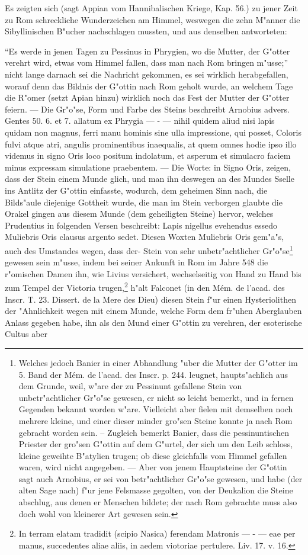 \documentclass[a4paper, 11pt, oneside, polutonikogreek, german]{article}
\begin{document}
Es zeigten sich (sagt Appian vom Hannibalischen Kriege, Kap. 56.) zu jener Zeit zu Rom schreckliche Wunderzeichen am Himmel, weswegen die zehn M"anner die Sibyllinischen B"ucher nachschlagen mussten, und aus denselben antworteten:

"`Es werde in jenen Tagen zu Pessinus in Phrygien, wo die Mutter, der G"otter verehrt wird, etwas vom Himmel fallen, dass man nach Rom bringen m"usse;"' nicht lange darnach sei die Nachricht gekommen, es sei wirklich herabgefallen, worauf denn das Bildnis der G"ottin nach Rom geholt wurde, an welchem Tage die R"omer (setzt Apian hinzu) wirklich noch das Fest der Mutter der G"otter feiern. --- Die Gr"o"se, Form und Farbe des Steins beschreibt Arnobius advers. Gentes 50. 6. et 7. allatum ex Phrygia --- - --- nihil quidem aliud nisi lapis quidam non magnus, ferri manu hominis sine ulla impressione, qui posset, Coloris fulvi atque atri, angulis prominentibus inaequalis, at quem omnes hodie ipso illo videmus in signo Oris loco positum indolatum, et asperum et simulacro faciem minus expressam simulatione praebentem. --- Die Worte: in Signo Oris, zeigen, dass der Stein einem Munde glich, und man ihn deswegen an des Mundes Sselle ins Antlitz der G"ottin einfasste, wodurch, dem geheimen Sinn nach, die Bilds"aule diejenige Gottheit wurde, die man im Stein verborgen glaubte die Orakel gingen aus diesem Munde (dem geheiligten Steine) hervor, welches Prudentius in folgenden Versen beschreibt: Lapis nigellus evehendus essedo Muliebris Oris clausus argento sedet. Diesen Woxten Muliebris Oris gem"a"s, auch des Umstandes wegen, dass der- Stein von sehr unbetr"achtlicher Gr"o"se\footnote{Welches jedoch Banier in einer Abhandlung "uber die Mutter der G"otter im 5. Band der Mém. de l'acad. des Inscr. p. 244. leugnet, haupts"achlich aus dem Grunde, weil, w"are der zu Pessinunt gefallene Stein von unbetr"achtlicher Gr"o"se gewesen, er nicht so leicht bemerkt, und in fernen Gegenden bekannt worden w"are. Vielleicht aber fielen mit demselben noch mehrere kleine, und einer dieser minder gro"sen Steine konnte ja nach Rom gebracht worden sein. -- Zugleich bemerkt Banier, dass die pessinuntischen Priester der gro"sen G"ottin auf dem G"urtel, der sich um den Leib schloss, kleine geweihte B"atylien trugen; ob diese gleichfalls vom Himmel gefallen waren, wird nicht angegeben. --- Aber von jenem Hauptsteine der G"ottin sagt auch Arnobius, er sei von betr"achtlicher Gr"o"se gewesen, und habe (der alten Sage nach) f"ur jene Felsmasse gegolten, von der Deukalion die Steine abschlug, aus denen er Menschen bildete; der nach Rom gebrachte muss also doch wohl von kleinerer Art gewesen sein.} gewesen sein m"usse, indem bei seiner Ankunft in Rom im Jahre 548 die r"omischen Damen ihn, wie Livius versichert, wechselseitig von Hand zu Hand bis zum Tempel der Victoria trugen,\footnote{In terram elatam tradidit (scipio Nasica) ferendam Matronis --- - --- eae per manus, succedentes aliae aliis, in aedem viotoriae pertulere. Liv. 17. v. 16.} h"alt Falconet (in den Mém. de l'acad. des Inscr. T. 23. Dissert. de la Mere des Dieu) diesen Stein f"ur einen Hysteriolithen der "Ahnlichkeit wegen mit einem Munde, welche Form dem fr"uhen Aberglauben Anlass gegeben habe, ihn als den Mund einer G"ottin zu verehren, der esoterische Cultus aber 
\end{document}
